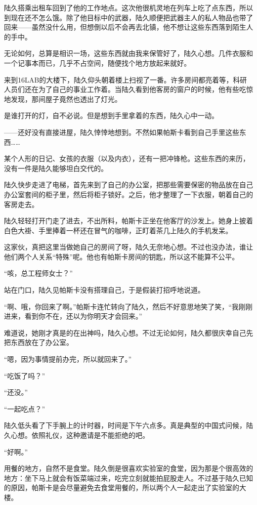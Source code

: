 陆久搭乘出租车回到了他的工作地点。这次他很机灵地在列车上吃了点东西，所以到现在还不怎么饿。除了他目标中的武器，陆久顺便把武器主人的私人物品也带了回来——虽然没什么用，但想倒以后不会再去北镇，他不想让这些东西落到陌生人的手中。

无论如何，总算是相识一场，这些东西就由我来保管好了，陆久心想。几件衣服和一个记事本而已，几乎不占空间，随便找个地方放起来就好。

来到16LAB的大楼下，陆久仰头朝着楼上扫视了一番。许多房间都亮着等，科研人员们还在为了自己的事业工作着。当陆久看到他客房的窗户的时候，他有些吃惊地发现，那间屋子竟然也透出了灯光。

是谁打开的灯，自不必说。但是想到手里拿着的东西，陆久心中一动。

——还好没有直接进屋，陆久悻悻地想到。不然如果帕斯卡看到自己手里这些东西……

某个人形的日记、女孩的衣服（以及内衣），还有一把冲锋枪。这些东西的来历，没有一件是陆久能够坦白交代的。

陆久快步走进了电梯，首先来到了自己的办公室，把那些需要保密的物品放在自己办公室套间的柜子里，然后将柜子锁好。之后，他才整理了一下衣服，朝着自己的客房走去。

陆久轻轻打开门走了进去，不出所料，帕斯卡正坐在他客厅的沙发上。她身上披着白色大褂、手里捧着一杯还在冒气的咖啡，正盯着茶几上陆久的手机发呆。

这家伙，真把这里当做她自己的房间了呀，陆久无奈地心想。不过也没办法，谁让他们两个人关系“特殊”呢。他也有帕斯卡房间的钥匙，所以这不能算不公平。

“咳，总工程师女士？”

站在门口，陆久见帕斯卡没有搭理自己，于是假装打招呼地说道。

“啊、哦，你回来了啊。”帕斯卡连忙转向了陆久，然后不好意思地笑了笑，“我刚刚进来，看到你不在，还以为你明天才会回来。”

难道说，她刚才真是的在出神吗，陆久心想。不过无论如何，陆久都很庆幸自己先把东西放在了办公室。

“嗯，因为事情提前办完，所以就回来了。”

“吃饭了吗？”

“还没。”

“一起吃点？”

陆久低头看了下手腕上的计时器，时间是下午六点多。真是典型的中国式问候，陆久心想。依照礼仪，这种邀请是不能拒绝的吧。

“好啊。”

用餐的地方，自然不是食堂。陆久倒是很喜欢实验室的食堂，因为那是个很高效的地方：坐下马上就会有饭菜端过来，吃完立刻就能拍屁股走人。不过基于陆久已知的原因，帕斯卡是会尽量避免去食堂用餐的，所以两个人一起走出了实验室的大楼。

